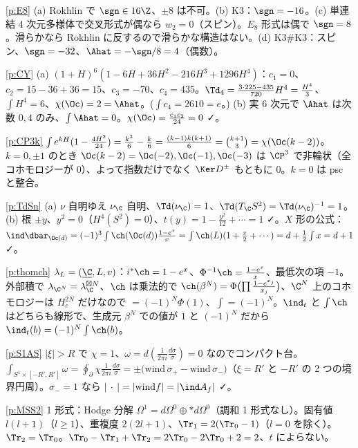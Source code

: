 \begin{sol}{\ref{p:E8}}
(a) Rokhlin で $\sgn\in16\Z$、$\pm8$ は不可。(b) K3：$\sgn=-16$。(c) 単連結 4 次元多様体で交叉形式が偶なら $w_2=0$（スピン）。$E_8$ 形式は偶で $\sgn=8$。滑らかなら Rokhlin に反するので滑らかな構造はない。(d) K3\#K3：スピン、$\sgn=-32$、$\Ahat=-\sgn/8=4$（偶数）。
\end{sol}
\begin{sol}{\ref{p:CY}}
(a) $(1+H)^6(1-6H+36H^2-216H^3+1296H^4)$：$c_1=0$、$c_2=15-36+36=15$、$c_3=-70$、$c_4=435$。$\Td_4=\frac{3\cdot225-435}{720}H^4=\frac{H^4}3$、$\int H^4=6$、$\chi(\Oc)=2=\Ahat$。($\int c_4=2610=e$。) (b) 実 6 次元で $\Ahat$ は次数 $0,4$ のみ、$\int\Ahat=0$。$\chi(\Oc)=\frac{c_1c_2}{24}=0$ ✓。
\end{sol}
\begin{sol}{\ref{p:CP3k}}
$\int e^{kH}(1-\frac{4H^2}{24})=\frac{k^3}6-\frac k6=\frac{(k-1)k(k+1)}6=\binom{k+1}3=\chi(\Oc(k-2))$。$k=0,\pm1$ のとき $\Oc(k-2)=\Oc(-2),\Oc(-1),\Oc(-3)$ は $\CP^3$ で非輪状（全コホモロジーが $0$）、よって指数だけでなく $\Ker D^\pm$ もともに $0$。$k=0$ は psc と整合。
\end{sol}
\begin{sol}{\ref{p:TdSn}}
(a) $\nu$ 自明ゆえ $\nu_{\C}$ 自明、$\Td(\nu_{\C})=1$、$\Td(T_{\C}S^2)=\Td(\nu_{\C})^{-1}=1$。(b) 根 $\pm y$、$y^2=0$（$H^4(S^2)=0$）、$t(y)=1-\frac{y^2}{12}+\cdots=1$ ✓。$X$ 形の公式：$\ind\dbar_{\Oc(d)}=(-1)^3\int\ch(\Oc(d))\frac{1-e^x}x=\int\ch(L)(1+\frac x2+\cdots)=d+\frac12\int x=d+1$ ✓。
\end{sol}
\begin{sol}{\ref{p:thomch}}
$\lambda_L=(\underline\C,L,v)$：$i^*\ch=1-e^x$、$\Phi^{-1}\ch=\frac{1-e^x}x$、最低次の項 $-1$。外部積で $\lambda_{\C^N}=\lambda_{\C}^{\boxtimes N}$、$\ch$ は乗法的で $\ch(\beta^N)=\Phi\bigl(\prod\frac{1-e^{x_j}}{x_j}\bigr)$、$\C^N$ 上のコホモロジーは $H^{2N}_c$ だけなので $=(-1)^N\Phi(1)$、$\int=(-1)^N$。$\ind_t$ と $\int\ch$ はどちらも線形で、生成元 $\beta^N$ での値が $1$ と $(-1)^N$ だから $\ind_t(b)=(-1)^N\int\ch(b)$。
\end{sol}
\begin{sol}{\ref{p:S1AS}}
$|\xi|>R$ で $\chi=1$、$\omega=d(\frac1{2\pi i}\frac{d\sigma}\sigma)=0$ なのでコンパクト台。$\int_{S^1\times[-R',R']}\omega=\oint_{\partial}\chi\frac1{2\pi i}\frac{d\sigma}\sigma=\pm\bigl(\mathrm{wind}\,\sigma_+-\mathrm{wind}\,\sigma_-\bigr)$（$\xi=R'$ と $-R'$ の 2 つの境界円周）。$\sigma_-=1$ なら $|\,\cdot\,|=|\mathrm{wind}f|=|\ind A_f|$ ✓。
\end{sol}
\begin{sol}{\ref{p:MSS2}}
1 形式：Hodge 分解 $\Omega^1=d\Omega^0\oplus\ast d\Omega^0$（調和 1 形式なし）。固有値 $l(l+1)$（$l\ge1$）、重複度 $2(2l+1)$、$\Tr_1=2(\Tr_0-1)$（$l=0$ を除く）。$\Tr_2=\Tr_0$。$\Tr_0-\Tr_1+\Tr_2=2\Tr_0-2\Tr_0+2=2$、$t$ によらない。
\end{sol}
